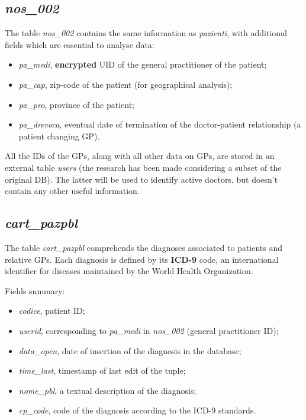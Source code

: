 \subsection{\textit{nos\_002}}
The table \textit{nos\_002} contains the same information as \textit{pazienti}, with additional fields which are essential to analyse data:
\begin{itemize}
	\item \textit{pa\_medi}, \textbf{encrypted} UID of the general practitioner of the patient;
	\item \textit{pa\_cap}, zip-code of the patient (for geographical analysis);
	\item \textit{pa\_pro}, province of the patient;
	\item \textit{pa\_drevoca}, eventual date of termination of the doctor-patient relationship (a patient changing GP).
\end{itemize}

All the IDs of the GPs, along with all other data on GPs, are stored in an external table \textit{users} (the research has been made considering a subset of the original DB). The latter will be used to identify active doctors, but doesn't contain any other useful information.

\subsection{\textit{cart\_pazpbl}}
The table \textit{cart\_pazpbl} comprehends the diagnoses associated to patients and relative GPs. Each diagnosis is defined by its \textbf{ICD-9} code, an international identifier for diseases maintained by the World Health Organization. 

Fields summary:
\begin{itemize}
	\item \textit{codice}, patient ID;
	\item \textit{userid}, corresponding to \textit{pa\_medi }in \textit{nos\_002 }(general practitioner ID);
	\item \textit{data\_open}, date of insertion of the diagnosis in the database;
	\item \textit{time\_last}, timestamp of last edit of the tuple;
	\item \textit{nome\_pbl}, a textual description of the diagnosis;
	\item \textit{cp\_code}, code of the diagnosis according to the ICD-9 standards.
\end{itemize}

